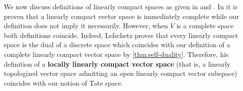 \begin{remark}\label{rem:lef-vs-beilinson}
	We now discuss definitions of linearly compact spaces as given in \cite{Lefschetz-Alg-Top} and \cite{Chiral}. In \cite{Lefschetz-Alg-Top} it is proven that a linearly compact vector space is immediately complete while our definition does not imply it necessarily. However, when $V$ is a complete space both definitions coincide. Indeed, Lefschetz proves that every linearly compact space is the dual of a discrete space which coincides with our definition of a complete linearly compact vector space by \cref{thm:self-duality}. Therefore, his definition of a \textbf{locally linearly compact vector space} (that is, a linearly topologized vector space admitting an open linearly compact vector subspace) coincides with our notion of Tate space.
\end{remark}
